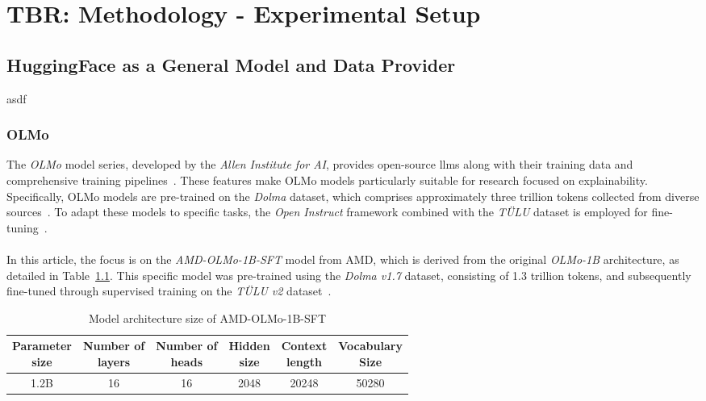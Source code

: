 \chapter{TBR: Methodology - Experimental Setup}

\section{HuggingFace as a General Model and Data Provider}
asdf

\subsection{OLMo}
The \emph{OLMo} model series, developed by the \emph{Allen Institute for AI}, provides open-source \acrshort{llm}s along with their training data and comprehensive training pipelines~\cite{Groeneveld2023OLMo}. These features make OLMo models particularly suitable for research focused on explainability. Specifically, OLMo models are pre-trained on the \emph{Dolma} dataset, which comprises approximately three trillion tokens collected from diverse sources~\cite{dolma}. To adapt these models to specific tasks, the \emph{Open Instruct} framework combined with the \emph{TÜLU} dataset is employed for fine-tuning~\cite{ivison2023camels}.
\\\\
In this article, the focus is on the \emph{AMD-OLMo-1B-SFT} model from AMD, which is derived from the original \emph{OLMo-1B} architecture, as detailed in Table~\ref{tab:model_architecture_olmo_1b_amd}. This specific model was pre-trained using the \emph{Dolma v1.7} dataset, consisting of 1.3 trillion tokens, and subsequently fine-tuned through supervised training on the \emph{TÜLU v2} dataset~\cite{AMD-OLMo}.
\begin{table}[htb]
    \centering
    \begin{tabular}{|c|c|c|c|c|c|}
        \hline  
        \BreakHeader{Parameter \\ size} & \BreakHeader{Number of \\ layers} & \BreakHeader{Number of \\ heads} & \BreakHeader{Hidden \\ size} & \BreakHeader{Context \\ length} & \BreakHeader{Vocabulary \\ Size} \\ 
        \hline  
        1.2B & 16 & 16 & 2048 & 20248 & 50280 \\
        \hline
    \end{tabular}
    \caption{Model architecture size of AMD-OLMo-1B-SFT}
    \label{tab:model_architecture_olmo_1b_amd}
\end{table}

